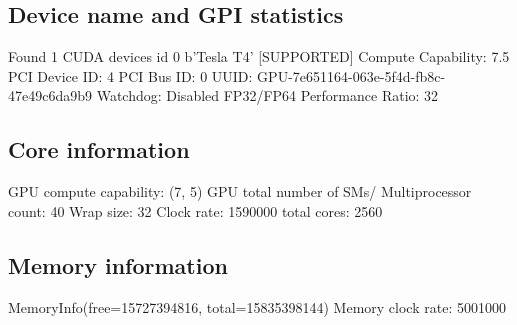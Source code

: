 \documentclass{article}
\begin{document}
\subsection{Device name and GPI statistics}
Found 1 CUDA devices
id 0             b'Tesla T4'                              [SUPPORTED]
                      Compute Capability: 7.5
                           PCI Device ID: 4
                              PCI Bus ID: 0
                                    UUID: GPU-7e651164-063e-5f4d-fb8c-47e49c6da9b9
                                Watchdog: Disabled
             FP32/FP64 Performance Ratio: 32

\subsection{Core information}
GPU compute capability: (7, 5)
GPU total number of SMs/ Multiprocessor count: 40
Wrap size: 32
Clock rate: 1590000
total cores: 2560

\subsection{Memory information}
MemoryInfo(free=15727394816, total=15835398144)
Memory clock rate: 5001000
\end{document}
